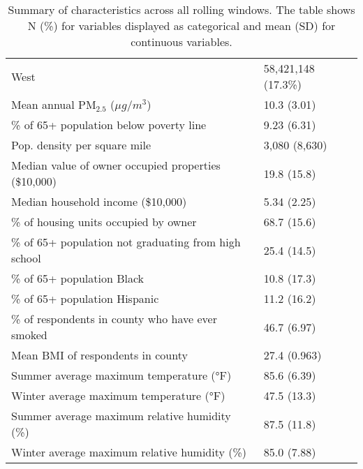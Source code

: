 \begin{table}[ht]
\begin{tabular}{ll}
    \hspace{10pt}West & 58,421,148 (17.3\%) \\ 
  Mean annual PM\(_{2.5}\) (\(\mu g/m^3 \)) & 10.3 (3.01) \\ 
  \% of 65+ population below poverty line & 9.23 (6.31) \\ 
  Pop. density per square mile & 3,080 (8,630) \\ 
  Median value of owner occupied properties (\$10,000) & 19.8 (15.8) \\ 
  Median household income (\$10,000) & 5.34 (2.25) \\ 
  \% of housing units occupied by owner & 68.7 (15.6) \\ 
  \% of 65+ population not graduating from high school & 25.4 (14.5) \\ 
  \% of 65+ population Black & 10.8 (17.3) \\ 
  \% of 65+ population Hispanic & 11.2 (16.2) \\ 
  \% of respondents in county who have ever smoked & 46.7 (6.97) \\ 
  Mean BMI of respondents in county & 27.4 (0.963) \\ 
  Summer average maximum temperature (°F) & 85.6 (6.39) \\ 
  Winter average maximum temperature (°F) & 47.5 (13.3) \\ 
  Summer average maximum relative humidity (\%) & 87.5 (11.8) \\ 
  Winter average maximum relative humidity (\%) & 85.0 (7.88) \\ 
   \hline
\end{tabular}
\caption{Summary of characteristics across all rolling windows. 
        The table shows N (\%) for variables displayed
        as categorical and mean (SD) for continuous variables.} 
\label{tab:table1_allpt}
\end{table}
